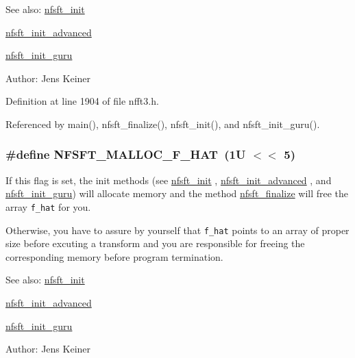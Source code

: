 \begin{Desc}
\item[See also:]\hyperlink{group__nfsft_g65cda3f4a3edc5eb39c697cf34b1f0b9}{nfsft\_\-init} 

\hyperlink{group__nfsft_ge7dca3e41afdb39e8c518af414878c18}{nfsft\_\-init\_\-advanced} 

\hyperlink{group__nfsft_g60466ed37643b6b7b7c1638056604d2b}{nfsft\_\-init\_\-guru} \end{Desc}
\begin{Desc}
\item[Author:]Jens Keiner \end{Desc}


Definition at line 1904 of file nfft3.h.

Referenced by main(), nfsft\_\-finalize(), nfsft\_\-init(), and nfsft\_\-init\_\-guru().\hypertarget{group__nfsft_gb76dcf8db948f18cc87403dac804fc68}{
\subsubsection{\setlength{\rightskip}{0pt plus 5cm}\#define NFSFT\_\-MALLOC\_\-F\_\-HAT~(1U $<$$<$ 5)}}
\label{group__nfsft_gb76dcf8db948f18cc87403dac804fc68}


If this flag is set, the init methods (see \hyperlink{group__nfsft_g65cda3f4a3edc5eb39c697cf34b1f0b9}{nfsft\_\-init} , \hyperlink{group__nfsft_ge7dca3e41afdb39e8c518af414878c18}{nfsft\_\-init\_\-advanced} , and \hyperlink{group__nfsft_g60466ed37643b6b7b7c1638056604d2b}{nfsft\_\-init\_\-guru}) will allocate memory and the method \hyperlink{group__nfsft_ga63e193a27d84059742ff25ff81e2ed1}{nfsft\_\-finalize} will free the array {\tt f\_\-hat} for you. 

Otherwise, you have to assure by yourself that {\tt f\_\-hat} points to an array of proper size before excuting a transform and you are responsible for freeing the corresponding memory before program termination.

\begin{Desc}
\item[See also:]\hyperlink{group__nfsft_g65cda3f4a3edc5eb39c697cf34b1f0b9}{nfsft\_\-init} 

\hyperlink{group__nfsft_ge7dca3e41afdb39e8c518af414878c18}{nfsft\_\-init\_\-advanced} 

\hyperlink{group__nfsft_g60466ed37643b6b7b7c1638056604d2b}{nfsft\_\-init\_\-guru} \end{Desc}
\begin{Desc}
\item[Author:]Jens Keiner \end{Desc}


